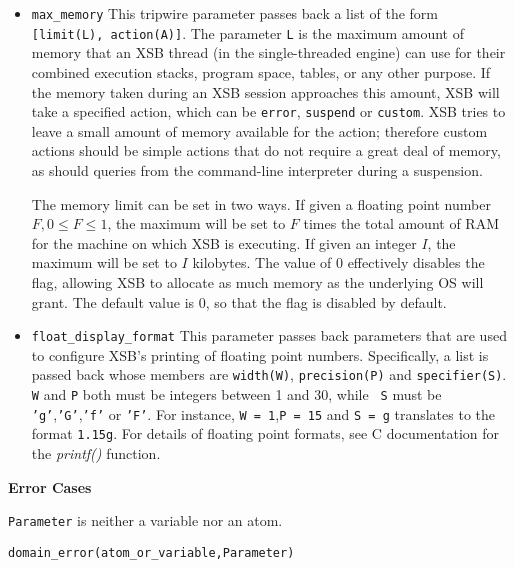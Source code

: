 \begin{description}
\begin{itemize}
{\tt L} is a non-negative integer, while {\tt A} can have the value
 {\tt abstract}, {\tt error}, {\tt suspend} or {\tt custom}.  When the
 limit is set to 0, this tripwire is disabled.  The default limit is
 {\tt 0} and the default action is {\tt error}.

\item {\tt max\_memory} This tripwire parameter passes back a list of
 the form {\tt [limit(L), action(A)]}.  The parameter {\tt L} is the
 maximum amount of memory that an XSB thread (in the single-threaded
 engine)
 can use for their combined execution stacks, program space, tables,
 or any other purpose.  If the memory taken during an XSB session
 approaches this amount, XSB will take a specified action, which can
 be {\tt error}, {\tt suspend} or {\tt custom}.  XSB tries to leave a
 small amount of memory available for the action; therefore custom
 actions should be simple actions that do not require a great deal of
 memory, as should queries from the command-line interpreter during a
 suspension.

 The memory limit can be set in two ways.  If given a floating point
 number $F, 0 \le F \leq 1$, the maximum will be set to $F$ times the
 total amount of RAM for the machine on which XSB is executing.  If
 given an integer $I$, the maximum will be set to $I$ kilobytes.  The
 value of 0 effectively disables the flag, allowing XSB to allocate as
 much memory as the underlying OS will grant.  The default value is 0,
 so that the flag is disabled by default.

\item {\tt float\_display\_format}
  This parameter passes back
  parameters that are used to configure XSB's printing of floating
  point numbers.  Specifically, a list is passed back whose members
  are {\tt width(W)}, {\tt precision(P)} and {\tt specifier(S)}.  {\tt
    W} and {\tt P} both must be integers between 1 and 30, while {\tt
    S} must be {\tt 'g'},{\tt 'G'},{\tt 'f'} or {\tt 'F'}.  For
  instance, {\tt W = 1},{\tt P = 15} and {\tt S = g} translates to the
  format {\tt 1.15g}.  For details of floating point formats, see C
  documentation for the {\em printf()} function.

\end{itemize}
{\bf Error Cases}
\bi
\item 	{\tt Parameter} is neither a variable nor an atom.
\bi
\item 	{\tt domain\_error(atom\_or\_variable,Parameter)}
\ei
\ei


\end{description}
